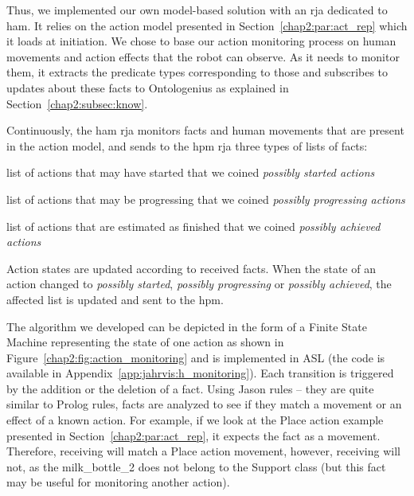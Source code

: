 \documentclass[a4paper,11pt,twoside]{StyleThese}
\begin{document}
Thus, we implemented our own model-based solution with an \acrshort{rja} dedicated to \acrfull{ham}. It relies on the action model presented in Section~\ref{chap2:par:act_rep} which it loads at initiation. We chose to base our action monitoring process on human movements and action effects that the robot can observe. As it needs to monitor them, it extracts the predicate types corresponding to those and subscribes to updates about these facts to Ontologenius as explained in Section~\ref{chap2:subsec:know}. 

Continuously, the \acrshort{ham} \acrshort{rja} monitors facts and human movements that are present in the action model, and sends to the \acrfull{hpm} \acrshort{rja} three types of lists of facts: 
\begin{bulletList}
	\item list of actions that may have started that we coined \emph{possibly started actions}
	\item list of actions that may be progressing that we coined \emph{possibly progressing actions}
	\item list of actions that are estimated as finished that we coined \emph{possibly achieved actions} 
\end{bulletList}

Action states are updated according to received facts. When the state of an action changed to \emph{possibly started}, \emph{possibly progressing} or \emph{possibly achieved}, the affected list is updated and sent to the \acrshort{hpm}. 

The algorithm we developed can be depicted in the form of a Finite State Machine representing the state of one action as shown in Figure~\ref{chap2:fig:action_monitoring} and is implemented in ASL (the code is available in Appendix~\ref{app:jahrvis:h_monitoring}). Each transition is triggered by the addition or the deletion of a fact. Using Jason rules -- they are quite similar to Prolog rules, facts are analyzed to see if they match a movement or an effect of a known action. For example, if we look at the Place action example presented in Section~\ref{chap2:par:act_rep}, it expects the fact  as a movement. Therefore, receiving  will match a Place action movement, however, receiving  will not, as the milk\_bottle\_2 does not belong to the Support class (but this fact may be useful for monitoring another action).
 
\end{document}
